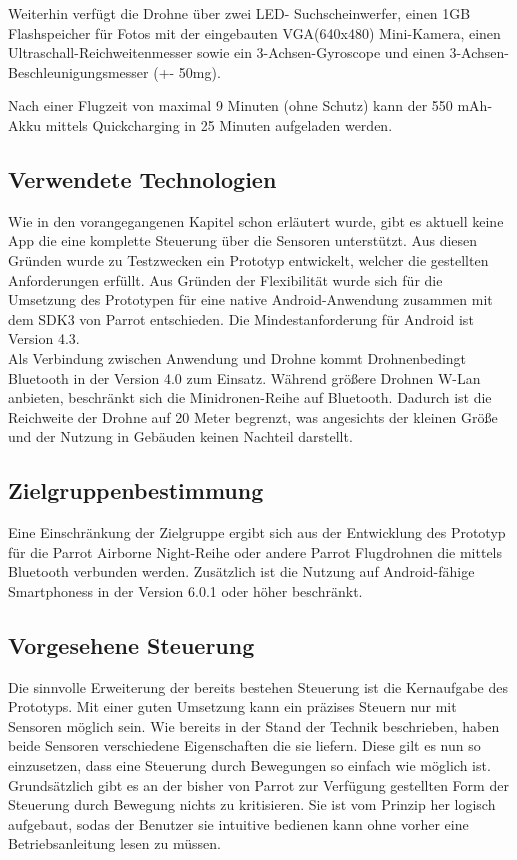 \documentclass{article}
\begin{document}
Weiterhin verfügt die Drohne über zwei LED- Suchscheinwerfer, einen 1GB Flashspeicher für Fotos mit der eingebauten VGA(640x480) Mini-Kamera, einen Ultraschall-Reichweitenmesser sowie ein 3-Achsen-Gyroscope und einen 3-Achsen- Beschleunigungsmesser (+\/- 50mg).

Nach einer Flugzeit von maximal 9 Minuten (ohne Schutz) kann der 550 mAh-Akku mittels Quickcharging in 25 Minuten aufgeladen werden.

\subsection{Verwendete Technologien}
Wie in den vorangegangenen Kapitel schon erläutert wurde, gibt es aktuell keine App die eine komplette Steuerung über die Sensoren unterstützt. Aus diesen Gründen wurde zu Testzwecken ein Prototyp entwickelt, welcher die gestellten Anforderungen erfüllt. Aus Gründen der Flexibilität wurde sich für die Umsetzung des Prototypen für eine native Android-Anwendung zusammen mit dem SDK3 von Parrot entschieden. Die Mindestanforderung für Android ist Version 4.3.\\

Als Verbindung zwischen Anwendung und Drohne kommt Drohnenbedingt Bluetooth in der Version 4.0 zum Einsatz. Während größere Drohnen W-Lan anbieten, beschränkt sich die Minidronen-Reihe auf Bluetooth. Dadurch ist die Reichweite der Drohne auf 20 Meter begrenzt, was angesichts der kleinen Größe und der Nutzung in Gebäuden keinen Nachteil darstellt.

\subsection{Zielgruppenbestimmung}
Eine Einschränkung der Zielgruppe ergibt sich aus der Entwicklung des Prototyp für die Parrot Airborne Night-Reihe oder andere Parrot Flugdrohnen die mittels Bluetooth verbunden werden. Zusätzlich ist die Nutzung auf Android-fähige Smartphoness in der Version 6.0.1 oder höher beschränkt.
  
\subsection{Vorgesehene Steuerung}
Die sinnvolle Erweiterung der bereits bestehen Steuerung ist die Kernaufgabe des Prototyps. Mit einer guten Umsetzung kann ein präzises Steuern nur mit Sensoren möglich sein. Wie bereits in der Stand der Technik beschrieben, haben beide Sensoren verschiedene Eigenschaften die sie liefern. Diese gilt es nun so einzusetzen, dass eine Steuerung durch Bewegungen so einfach wie möglich ist. Grundsätzlich gibt es an der bisher von Parrot zur Verfügung gestellten Form der Steuerung durch Bewegung nichts zu kritisieren. Sie ist vom Prinzip her logisch aufgebaut, sodas der Benutzer sie intuitive bedienen kann ohne vorher eine Betriebsanleitung lesen zu müssen.
\end{document}
